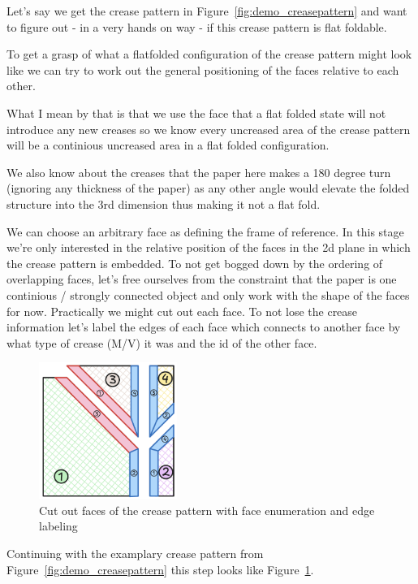 Let's say we get the crease pattern in Figure~\ref{fig:demo_creasepattern} and want to figure out - in a very hands on way - if this crease pattern is flat foldable.

To get a grasp of what a flatfolded configuration of the crease pattern might look like we can try to work out the general positioning of the faces relative to each other.

What I mean by that is that we use the face that a flat folded state will not introduce any new creases so we know every
uncreased area of the crease pattern will be a continious uncreased area in a flat folded configuration.

We also know about the creases that the paper here makes a 180 degree turn (ignoring any thickness of the paper) as any
other angle would elevate the folded structure into the 3rd dimension thus making it not a flat fold.

We can choose an arbitrary face as defining the frame of reference.
In this stage we're only interested in the relative position of the faces in the 2d plane in which the crease pattern is embedded.
To not get bogged down by the ordering of overlapping faces, let's free ourselves from the constraint that the paper is one continious / strongly connected object and only work with the shape of the faces for now.
Practically we might cut out each face. To not lose the crease information let's label the edges of each
face which connects to another face by what type of crease (M/V) it was and the id of the other face.

\begin{figure}[h]
\centering
\includegraphics[width=0.4\textwidth]{assets/demo_faces.png}
\caption{Cut out faces of the crease pattern with face enumeration and edge labeling}
\label{fig:demo_faces}
\end{figure}

Continuing with the examplary crease pattern from Figure~\ref{fig:demo_creasepattern} this step looks like Figure~\ref{fig:demo_faces}.

